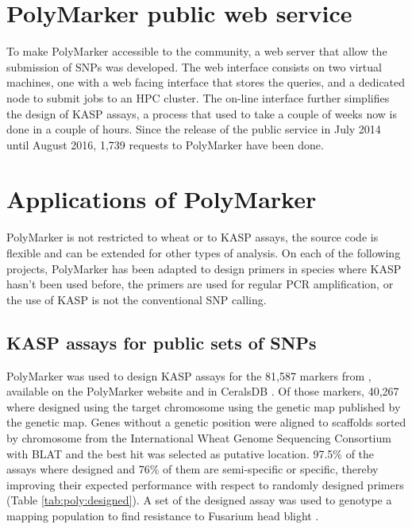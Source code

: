 \section{PolyMarker public web service}
To make PolyMarker accessible to the community, a web server that allow the submission of SNPs was developed. 
The web interface consists on two virtual machines, one with a web facing interface that stores the queries, and a dedicated node to submit jobs to an HPC cluster.
The on-line interface further simplifies the design of KASP assays, a process that used to take a couple of weeks now is done in a couple of hours. 
Since the release of the public service in July 2014 until August 2016, 1,739 requests to PolyMarker have been done. 


\section{Applications of PolyMarker}

PolyMarker is not restricted to wheat or to KASP assays, the source code is flexible and can be extended for other types of analysis. 
On each of the following projects, PolyMarker has been adapted to design primers in species where KASP hasn't been used before, the primers are used for regular PCR amplification, or the use of KASP is not the conventional SNP calling. 

\subsection{KASP assays for public sets of SNPs} 
PolyMarker was used to design KASP assays for the 81,587 markers from \citep{Wang2014}, available on the PolyMarker website and in CeralsDB \citep{Wilkinson2012}. 
Of those markers, 40,267 where designed using the target chromosome using the genetic map published by the genetic map. 
Genes without a genetic position were aligned to scaffolds sorted by chromosome from the International Wheat Genome Sequencing Consortium \citep{Mayer2014} with BLAT \citep{Kent2002} and the best hit was selected as putative location. 
97.5\% of the assays where designed and 76\% of them are semi-specific or specific, thereby improving their expected performance with respect to randomly designed primers (Table \ref{tab:poly:designed}). 
A set of the designed assay was used to genotype a mapping population to find resistance to Fusarium head blight \citep{Burt2015}. 

